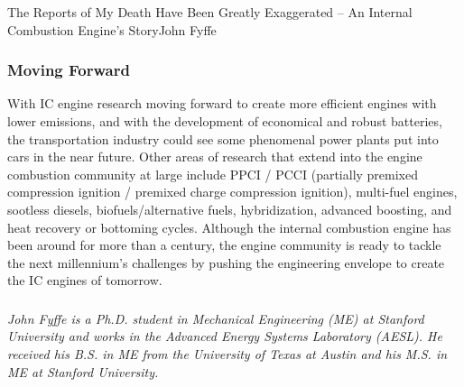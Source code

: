 \documentclass{papertex}
\begin{document}
\begin{news}{2}{The Reports of My Death Have Been Greatly Exaggerated -- An Internal Combustion Engine’s Story}{John Fyffe}{}{}
\subsubsection*{Moving Forward}

With IC engine research moving forward to create more efficient engines with 
lower emissions, and with the development of economical and robust batteries, 
the transportation industry could see some phenomenal power plants put into 
cars in the near future.  Other areas of research that extend into the engine 
combustion community at large include PPCI / PCCI (partially premixed 
compression ignition / premixed charge compression ignition), multi-fuel 
engines, sootless diesels, biofuels/alternative fuels, hybridization, advanced 
boosting, and heat recovery or bottoming cycles.  Although the internal 
combustion engine has been around for more than a century, the engine 
community is ready to tackle the next millennium’s challenges by pushing the 
engineering envelope to create the IC engines of tomorrow.

\subsubsection*{}

\emph{John Fyffe is a Ph.D. student in Mechanical Engineering (ME) at Stanford University and works in the Advanced Energy Systems Laboratory (AESL). He received his B.S. in ME from the University of Texas at Austin and his M.S. in ME at Stanford University.}

\end{news}
\end{document}
